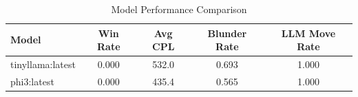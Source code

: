 \begin{table}[h]
\centering
\caption{Model Performance Comparison}
\begin{tabular}{lcccc}
\toprule
Model & Win Rate & Avg CPL & Blunder Rate & LLM Move Rate \\
\midrule
tinyllama:latest & 0.000 & 532.0 & 0.693 & 1.000 \\
phi3:latest & 0.000 & 435.4 & 0.565 & 1.000 \\
\bottomrule
\end{tabular}
\end{table}